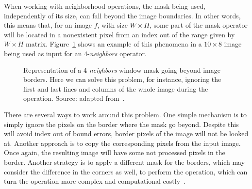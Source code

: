 When working with neighborhood operations, the mask being used, independently of its size, can fall beyond the image boundaries. In other words, this means that, for an image $f$, with size $W \times H$, some part of the mask operator will be located in a nonexistent pixel from an index out of the range given by $W \times H$ matrix. Figure~\ref{fig:img_boundaries} shows an example of this phenomena in a $10 \times 8$ image being used as input for an 4-\textit{neighbors} operator.

\begin{figure}[ht]
    \centering

    \caption[Representation of a 4-\textit{neighbors} window mask going beyond image borders]{Representation of a 4-\textit{neighbors} window mask going beyond image borders. Here we can solve this problem, for instance, ignoring the first and last lines and columns of the whole image during the operation. Source: adapted from~\citet{pedrini:08}.}
    \label{fig:img_boundaries}
\end{figure}

There are several ways to work around this problem. One simple mechanism is to simply ignore the pixels on the border where the mask go beyond. Despite this will avoid index out of bound errors, border pixels of the image will not be looked at. Another approach is to copy the corresponding pixels from the input image. Once again, the resulting image will have some not processed pixels in the border. Another strategy is to apply a different mask for the borders, which may consider the difference in the corners as well, to perform the operation, which can turn the operation more complex and computational costly~\citep{pedrini:08}.


